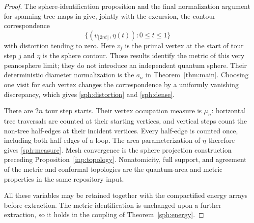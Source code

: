 \begin{proof}
The sphere-identification proposition and the final normalization
argument for spanning-tree maps in \cite{MetricMaps} give, jointly
with the excursion, the contour correspondence
\[
 \bigl\{(v_{\lfloor2nt\rfloor},\eta(t)):0\le t\le1\bigr\}
\]
with distortion tending to zero.  Here $v_j$ is the primal vertex
at the start of tour step $j$ and $\eta$ is the sphere contour.
Those results identify the metric of this very peanosphere limit;
they do not introduce an independent quantum sphere.  Their
deterministic diameter normalization is the $a_n$ in
Theorem~\ref{thm:main}.  Choosing one visit for each vertex changes
the correspondence by a uniformly vanishing discrepancy, which
gives \eqref{sph:distortion} and \eqref{sph:dense}.

There are $2n$ tour step starts.  Their vertex occupation measure is
$\mu_n$: horizontal tree traversals are counted at their starting
vertices, and vertical steps count the non-tree half-edges at their
incident vertices.  Every half-edge is counted once, including both
half-edges of a loop.  The area parameterization of $\eta$ therefore
gives \eqref{sph:measure}.  Mesh convergence is the sphere
projection construction preceding Proposition~\ref{inp:topology}.
Nonatomicity, full support, and agreement of the metric and conformal
topologies are the quantum-area and metric properties in the same
repository input.

All these variables may be retained together with the compactified
energy arrays before extraction.  The metric identification is
unchanged upon a further extraction, so it holds in the coupling of
Theorem~\ref{sph:energy}.
\end{proof}
